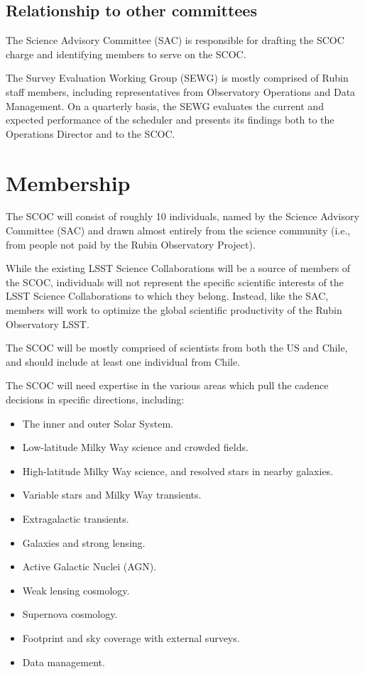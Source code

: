 \documentclass[OPS,lsstdraft,authoryear,toc]{lsstdoc}
\begin{document}
\subsection{Relationship to other committees}

The Science Advisory Committee (SAC) is responsible for drafting the SCOC charge and identifying
members to serve on the SCOC.

The Survey Evaluation Working Group (SEWG) is mostly comprised of Rubin staff members,
including representatives from Observatory Operations and Data Management.
On a quarterly basis, the SEWG evaluates the current and expected performance of the scheduler
and presents its findings both to the Operations Director and to the SCOC.


\section{Membership}

The SCOC will consist of roughly 10 individuals, named by the Science Advisory Committee (SAC)
and drawn almost entirely from the science community (i.e., from people not paid by the Rubin Observatory Project). 

While the existing LSST Science Collaborations will be a source of members of the SCOC, individuals
will not represent the specific scientific interests of the LSST Science Collaborations to which they belong.
Instead, like the SAC, members will work to optimize the global scientific productivity of the Rubin Observatory LSST.

The SCOC will be mostly comprised of scientists from both the US and Chile,
and should include at least one individual from Chile.

The SCOC will need expertise in the various areas which pull the cadence decisions in specific directions,
including:

\begin{itemize}
\item The inner and outer Solar System.
\item Low-latitude Milky Way science and crowded fields.
\item High-latitude Milky Way science, and resolved stars in nearby galaxies.
\item Variable stars and Milky Way transients.
\item Extragalactic transients.
\item Galaxies and strong lensing.
\item Active Galactic Nuclei (AGN).
\item Weak lensing cosmology.
\item Supernova cosmology.
\item Footprint and sky coverage with external surveys.
\item Data management.
\end{itemize}
\end{document}
